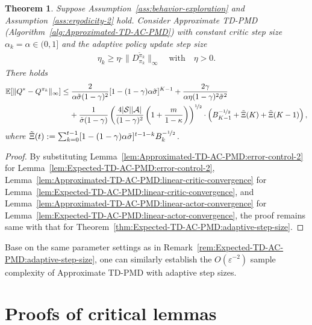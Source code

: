 \documentclass[10pt]{article}
\newcommand{\calA}{\mathcal{A}}
\newcommand{\calS}{\mathcal{S}}
\newcommand{\E}{\mathbb{E}}
\newcommand{\ls}{\left}
\newcommand{\rs}{\right}
\theoremstyle{plain}
\newtheorem{theorem}{Theorem}[section]
\theoremstyle{definition}
\begin{document}
\begin{theorem}
    Suppose Assumption~\ref{ass:behavior-exploration} and Assumption~\ref{ass:ergodicity-2} hold. Consider Approximate TD-PMD \textup{(}Algorithm~\ref{alg:Approximated-TD-AC-PMD}\textup{)} with constant critic step size $\alpha_k = \alpha \in (0,1]$ and the adaptive policy update step size
    \begin{align*}
        \eta_k \geq \eta \cdot \| D^{\tilde\pi_k}_{\pi_k} \|_\infty \quad \mbox{with} \quad \eta > 0.
    \end{align*}
    There holds
    \begin{align*}
        \E[\| Q^* - Q^{\pi_k} \|_\infty] &\leq \frac{2}{\alpha \tilde\sigma (1-\gamma)^2}[1-(1-\gamma)\alpha\tilde\sigma]^{K-1} + \frac{2\gamma}{\alpha\eta(1-\gamma)^2\tilde\sigma^2 } \\
        &\;\;\;\;+ \frac{1}{\tilde\sigma (1-\gamma)} \ls(\frac{4|\calS||\calA|}{(1-\gamma)^2} \ls( 1 + \frac{m}{1-\kappa}\rs)\rs)^{\nicefrac{1}{2}} \cdot \ls( B_{K-1}^{-\nicefrac{1}{2}} + \tilde\Xi(K) + \tilde\Xi(K-1) \rs),
    \end{align*}
    where $\tilde\Xi(t) := \sum_{k=0}^{t-1} [1-(1-\gamma)\alpha\tilde\sigma]^{t-1-k} B_k^{-\nicefrac{1}{2}}$.
    \label{thm:Approximated-TD-AC-PMD:adaptive-step-size}
\end{theorem}
\begin{proof}
    By substituting Lemma~\ref{lem:Approximated-TD-AC-PMD:error-control-2} for Lemma~\ref{lem:Expected-TD-AC-PMD:error-control-2}, Lemma~\ref{lem:Approximated-TD-AC-PMD:linear-critic-convergence} for Lemma~\ref{lem:Expected-TD-AC-PMD:linear-critic-convergence}, and Lemma~\ref{lem:Approximated-TD-AC-PMD:linear-actor-convergence} for Lemma~\ref{lem:Expected-TD-AC-PMD:linear-actor-convergence}, the proof remains same with that for Theorem~\ref{thm:Expected-TD-AC-PMD:adaptive-step-size}.
\end{proof}
Base on the same parameter settings as in Remark~\ref{rem:Expected-TD-AC-PMD:adaptive-step-size}, one can similarly  establish the $O(\varepsilon^{-2})$ sample complexity of Approximate TD-PMD with adaptive step sizes.


\section{Proofs of critical lemmas}\label{sec:lemma-proof}
\end{document}
